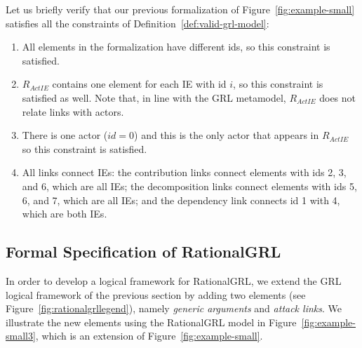 Let us briefly verify that our previous formalization of Figure~\ref{fig:example-small} satisfies all the constraints of Definition~\ref{def:valid-grl-model}:
\begin{enumerate}
\item All elements in the formalization have different ids, so this constraint is satisfied.
\item $R_{ActIE}$ contains one element for each IE with id $i$, so this constraint is satisfied as well. Note that, in line with the GRL metamodel, $R_{ActIE}$ does not relate links with actors. 
\item There is one actor ($id=0$) and this is the only actor that appears in $R_{ActIE}$ so this constraint is satisfied.
\item All links connect IEs: the contribution links connect elements with ids 2, 3, and 6, which are all IEs; the decomposition links connect elements with ids 5, 6, and 7, which are all IEs; and the dependency link connects id 1 with 4, which are both IEs.
\end{enumerate}

\subsection{Formal Specification of RationalGRL}
\label{sect:formalframework:rationalgrl}

In order to develop a logical framework for RationalGRL, we extend the GRL logical framework of the previous section by adding two elements (see Figure~\ref{fig:rationalgrllegend}), namely \emph{generic arguments} and \emph{attack links}. We illustrate the new elements using the RationalGRL model in Figure~\ref{fig:example-small3}, which is an extension of Figure~\ref{fig:example-small}. 

